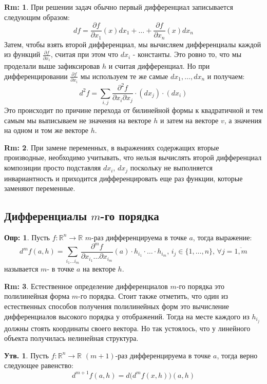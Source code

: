 \documentclass[12pt]{article}
\newcommand{\MR}{\mathbb{R}}
\theoremstyle{definition}
\newtheorem{defn}{Опр:}
\newtheorem{rem}{Rm:}
\newtheorem{prop}{Утв.}
\begin{document}
\begin{rem}
	При решении задач обычно первый дифференциал записывается следующим образом:
	$$
		df = \dfrac{\partial f}{\partial x_1}(x)dx_1 + \dotsc + \dfrac{\partial f}{\partial x_n}(x)dx_n
	$$
	Затем, чтобы взять второй дифференциал, мы вычисляем дифференциалы каждой из функций $\tfrac{\partial f}{\partial x_i}$, считая при этом что $dx_i$ - константы. Это ровно то, что мы проделали выше зафиксировав $h$ и считая дифференциал. Но при дифференцировании $\tfrac{\partial f}{\partial x_i}$ мы используем те же самые $dx_1, \dotsc, dx_n$ и получаем: 
	$$
		d^2f = \displaystyle \sum\limits_{i,j}\dfrac{\partial^2 f}{\partial x_i \partial x_j}{\cdot}(dx_j){\cdot}(dx_i)
	$$
	Это происходит по причине перехода от билинейной формы к квадратичной и тем самым мы выписываем не значения на векторе $h$ и затем на векторе $v$, а значения на одном и том же векторе $h$.
\end{rem}
\begin{rem}
	При замене переменных, в выражениях содержащих вторые производные, необходимо учитывать, что нельзя вычислять второй дифференциал композиции просто подставляя $dx_i, \, dx_j$ поскольку не выполняется инвариантность и приходится дифференцировать еще раз функции, которые заменяют переменные.
\end{rem}
\subsection*{Дифференциалы $m$-го порядка}
\begin{defn}
	Пусть $f\colon \MR^n \to \MR$ $m$-раз дифференцируема в точке $a$, тогда выражение:
	$$
		d^mf(a,h) = \displaystyle \sum\limits_{i_1 \dotsc i_m}\dfrac{\partial^m f}{\partial x_{i_1} \dotsc \partial x_{i_m}}(a){\cdot}h_{i_1}{\cdot}\dotsc{\cdot}h_{i_m}, \, i_j \in \{1, \dotsc, n\}, \, \forall j = \overline{1,m}
	$$
	называется  $m$- в точке $a$ на векторе $h$.
\end{defn}
\begin{rem}
	Естественное определение дифференциалов $m$-го порядка это полилинейная форма $m$-го порядка. Стоит также отметить, что один из естественных способов получения полилинейных форм это вычисление дифференциалов высокого порядка у отображений. Тогда на месте каждого из $h_{i_j}$ должны стоять координаты своего вектора. Но так устоялось, что у линейного объекта получилась нелинейная структура.
\end{rem}
\begin{prop}
	Пусть $f\colon \MR^n \to \MR$ $(m+1)$-раз дифференцируема в точке $a$, тогда верно следующее равенство:
	$$
		d^{m+1}f(a,h) = d\big(d^mf(x,h)\big)(a,h)
	$$
\end{prop}
\end{document}
